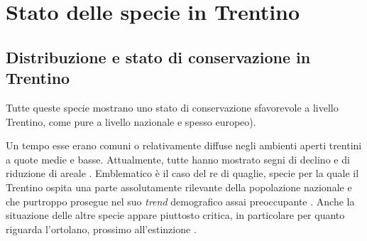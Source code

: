 \documentclass[10pt,twoside,openany,x11names,svgnames,italian,a5paper,dvipsnames,table]{memoir}
\newcommand\chapterillustration{}
\begin{document}
\begin{table}[H]
\centering
{}
\end{table}

 
\chapter{Stato delle specie in Trentino}
\renewcommand\chapterillustration{1.JPG}

\section{Distribuzione e stato di conservazione in Trentino}
Tutte queste specie mostrano uno stato di conservazione sfavorevole a livello Trentino, come pure a livello nazionale e spesso europeo).

Un tempo esse erano comuni o relativamente diffuse negli ambienti aperti trentini a quote medie e basse. Attualmente, tutte hanno mostrato segni di declino e di riduzione di areale \cite{Pedrini05}. Emblematico è il caso del re di quaglie, specie per la quale il Trentino ospita una parte assolutamente rilevante della popolazione nazionale e che purtroppo prosegue nel suo \emph{trend} demografico assai preoccupante \cite{Pedrini02}. Anche la situazione delle altre specie appare piuttosto critica, in particolare per quanto riguarda l'ortolano, prossimo all'estinzione \cite{Pedrini05}.
\end{document}
